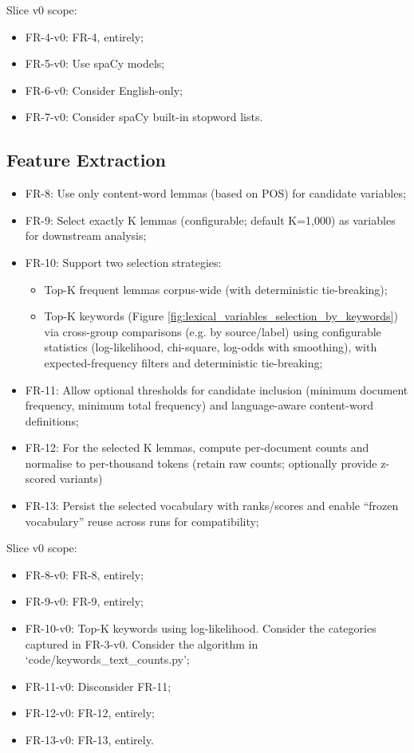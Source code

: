 Slice v0 scope:

\begin{itemize}
    \item FR-4-v0: FR-4, entirely;
    \item FR-5-v0: Use spaCy models;
    \item FR-6-v0: Consider English-only;
    \item FR-7-v0: Consider spaCy built-in stopword lists.
\end{itemize}

\subsection{Feature Extraction}

\begin{itemize}
    \item FR-8: Use only content-word lemmas (based on POS) for candidate variables;
    \item FR-9: Select exactly K lemmas (configurable; default K=1,000) as variables for downstream analysis;
    \item FR-10: Support two selection strategies:
    \begin{itemize}
        \item Top-K frequent lemmas corpus-wide (with deterministic tie-breaking);
        \item Top-K keywords (Figure \ref{fig:lexical_variables_selection_by_keywords}) via cross-group comparisons (e.g. by source/label) using configurable statistics (log-likelihood, chi-square, log-odds with smoothing), with expected-frequency filters and deterministic tie-breaking;
    \end{itemize}
    \item FR-11: Allow optional thresholds for candidate inclusion (minimum document frequency, minimum total frequency) and language-aware content-word definitions;
    \item FR-12: For the selected K lemmas, compute per-document counts and normalise to per-thousand tokens (retain raw counts; optionally provide z-scored variants)
    \item FR-13: Persist the selected vocabulary with ranks/scores and enable ``frozen vocabulary'' reuse across runs for compatibility;
\end{itemize}

Slice v0 scope:

\begin{itemize}
    \item FR-8-v0: FR-8, entirely;
    \item FR-9-v0: FR-9, entirely;
    \item FR-10-v0: Top-K keywords using log-likelihood. Consider the categories captured in FR-3-v0. Consider the algorithm in `code/keywords\_text\_counts.py';
    \item FR-11-v0: Disconsider FR-11;
    \item FR-12-v0: FR-12, entirely;
    \item FR-13-v0: FR-13, entirely.
\end{itemize}

